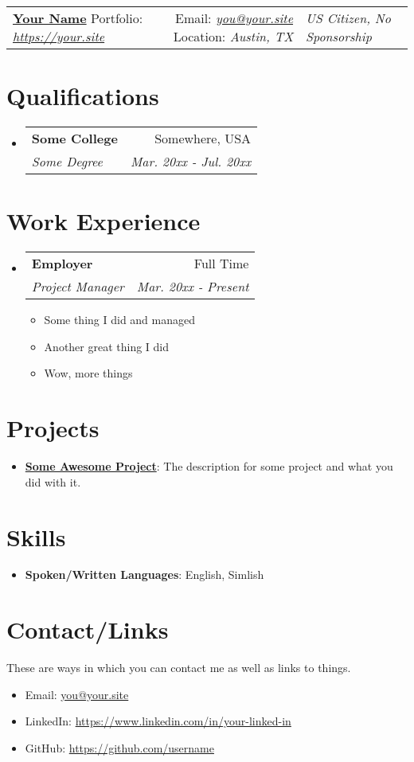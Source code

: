 \documentclass[letterpaper, 9pt]{article}
\makeatletter
\newcommand{\resumeItem}[2]{
  \item\small{
    \textbf{#1}{: #2 \vspace{-2pt}}
  }
}
\newcommand{\expItem}[1]{
  \item\small{#1 \vspace{-3pt}}
}
\newcommand{\resumeSubheading}[4]{
 \vspace{-1pt}\item
 \begin{tabular*}{0.97\textwidth}[t]{l@{\extracolsep{\fill}}r}
   \textbf{#1} & #2 \\
   \textit{\small#3} & \textit{\small #4} \\
 \end{tabular*}\vspace{-5pt}
}
\newcommand{\resumeSubItem}[2]{\resumeItem{#1}{#2}\vspace{-4pt}}
\newcommand{\resumeSubHeadingListStart}{\begin{itemize}[leftmargin=*]}
\newcommand{\resumeSubHeadingListEnd}{\end{itemize}}
\newcommand{\resumeItemListStart}{\begin{itemize}}
\newcommand{\resumeItemListEnd}{\end{itemize}\vspace{-5pt}}
\newcommand{\resumeHeading}[5]{
 \begin{tabular*}{\textwidth}{l@{\extracolsep{\fill}}r}
   \textbf{#1}
   \cr Portfolio: \textit{#2}
   & Email: \textit{#3}
   \cr Location: \textit{#4}
   & \textit{#5}
 \end{tabular*}
}
\newcommand{\name}{Your Name}
\newcommand{\site}{https://your.site}
\newcommand{\mail}{you@your.site}
\newcommand{\username}{username}
\makeatother
\begin{document}
\resumeHeading{\href{\site}{\Large \name}}
{\href{\site}{\site}}
{\href{mailto:\mail}{\mail}}
{Austin, TX}
{US Citizen, No Sponsorship}

\section{Qualifications}
  \resumeSubHeadingListStart
    \resumeSubheading
      {Some College}{Somewhere, USA}
      {Some Degree}{Mar. 20xx - Jul. 20xx}
\resumeSubHeadingListEnd

\section{Work Experience}
  \resumeSubHeadingListStart
    \resumeSubheading
      {Employer}{Full Time}
      {Project Manager}{Mar. 20xx - Present}
      \resumeItemListStart
      \expItem{Some thing I did and managed}
      \expItem{Another great thing I did}
      \expItem{Wow, more things}
    \resumeItemListEnd
  \resumeSubHeadingListEnd

\section{Projects}
  \resumeSubHeadingListStart
    \resumeSubItem{\href{https://github.com}{Some Awesome Project}}
    {The description for some project and what you did with it.}
  \resumeSubHeadingListEnd

\section{Skills}
  \resumeSubHeadingListStart
    \resumeSubItem{Spoken/Written Languages}
      {English, Simlish}
  \resumeSubHeadingListEnd

\section{Contact/Links}
  These are ways in which you can contact me as well as links to things.
  \resumeItemListStart
    \item{Email: \href{mailto:\mail}{\mail}}
    \item{LinkedIn: \href{https://www.linkedin.com/in/your-linked-in}{https://www.linkedin.com/in/your-linked-in}}
    \item{GitHub: \href{https://github.com/\username}{https://github.com/\username}}
  \resumeItemListEnd

\end{document}
